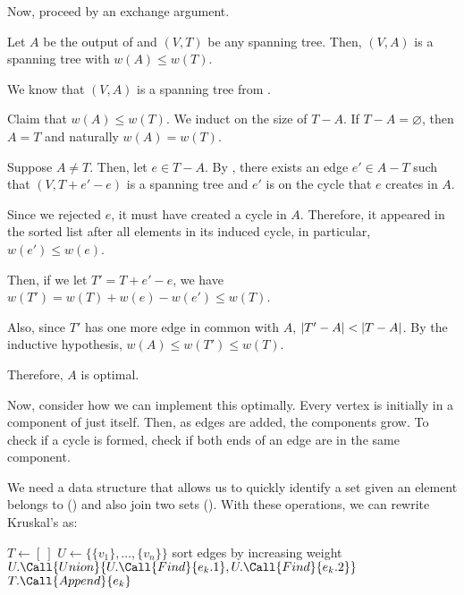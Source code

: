 Now, proceed by an exchange argument.

\begin{prop}
  Let $A$ be the output of  and $(V,T)$ be any spanning tree.
  Then, $(V,A)$ is a spanning tree with $w(A) \leq w(T)$.
\end{prop}
\begin{prf}
  We know that $(V,A)$ is a spanning tree from .

  Claim that $w(A) \leq w(T)$. We induct on the size of $T - A$.
  If $T - A = \varnothing$, then $A = T$ and naturally $w(A) = w(T)$.

  Suppose $A \neq T$. Then, let $e \in T - A$.
  By , there exists an edge $e' \in A - T$
  such that $(V, T+e'-e)$ is a spanning tree and $e'$ is on the cycle that $e$ creates in $A$.

  Since we rejected $e$, it must have created a cycle in $A$.
  Therefore, it appeared in the sorted list after all elements in its induced cycle,
  in particular, $w(e') \leq w(e)$.

  Then, if we let $T' = T + e' - e$,
  we have $w(T') = w(T) + w(e) - w(e') \leq w(T)$.

  Also, since $T'$ has one more edge in common with $A$,
  $\abs{T' - A} < \abs{T - A}$.
  By the inductive hypothesis, $w(A) \leq w(T') \leq w(T)$.

  Therefore, $A$ is optimal.
\end{prf}

Now, consider how we can implement this optimally.
Every vertex is initially in a component of just itself.
Then, as edges are added, the components grow.
To check if a cycle is formed, check if both ends of an edge are in the same component.

We need a data structure that allows us to quickly identify
a set given an element belongs to () and also join two sets ().
With these operations, we can rewrite Kruskal's as:

\begin{algorithm}[H]
  \caption{}
  \begin{algorithmic}[1]
    \State $T \gets [\ ]$
    \State $U \gets \{\{v_1\},\dotsc,\{v_n\}\}$
    \State sort edges by increasing weight
        \State $U.\Call{Union}{U.\Call{Find}{e_k.1}, U.\Call{Find}{e_k.2}}$
        \State $T.\Call{Append}{e_k}$
      \EndIf
    \EndFor
  \end{algorithmic}
\end{algorithm}

